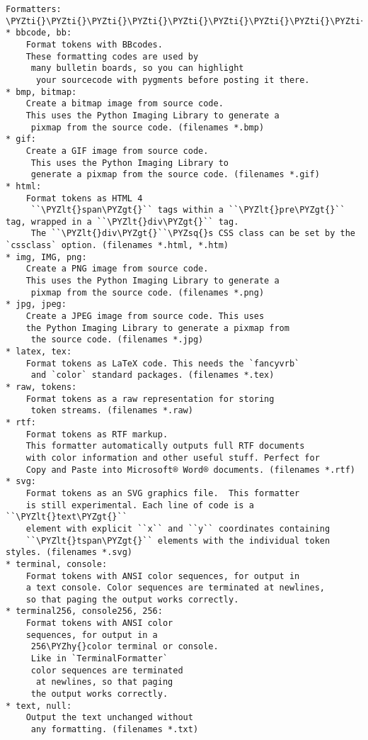 \begin{Verbatim}[commandchars=\\\{\}]
Formatters:
\PYZti{}\PYZti{}\PYZti{}\PYZti{}\PYZti{}\PYZti{}\PYZti{}\PYZti{}\PYZti{}\PYZti{}\PYZti{}
* bbcode, bb:
    Format tokens with BBcodes.
    These formatting codes are used by
     many bulletin boards, so you can highlight
      your sourcecode with pygments before posting it there.
* bmp, bitmap:
    Create a bitmap image from source code.
    This uses the Python Imaging Library to generate a
     pixmap from the source code. (filenames *.bmp)
* gif:
    Create a GIF image from source code.
     This uses the Python Imaging Library to
     generate a pixmap from the source code. (filenames *.gif)
* html:
    Format tokens as HTML 4
     ``\PYZlt{}span\PYZgt{}`` tags within a ``\PYZlt{}pre\PYZgt{}`` tag, wrapped in a ``\PYZlt{}div\PYZgt{}`` tag.
     The ``\PYZlt{}div\PYZgt{}``\PYZsq{}s CSS class can be set by the `cssclass` option. (filenames *.html, *.htm)
* img, IMG, png:
    Create a PNG image from source code.
    This uses the Python Imaging Library to generate a
     pixmap from the source code. (filenames *.png)
* jpg, jpeg:
    Create a JPEG image from source code. This uses
    the Python Imaging Library to generate a pixmap from
     the source code. (filenames *.jpg)
* latex, tex:
    Format tokens as LaTeX code. This needs the `fancyvrb`
     and `color` standard packages. (filenames *.tex)
* raw, tokens:
    Format tokens as a raw representation for storing
     token streams. (filenames *.raw)
* rtf:
    Format tokens as RTF markup.
    This formatter automatically outputs full RTF documents
    with color information and other useful stuff. Perfect for
    Copy and Paste into Microsoft® Word® documents. (filenames *.rtf)
* svg:
    Format tokens as an SVG graphics file.  This formatter
    is still experimental. Each line of code is a ``\PYZlt{}text\PYZgt{}``
    element with explicit ``x`` and ``y`` coordinates containing
    ``\PYZlt{}tspan\PYZgt{}`` elements with the individual token styles. (filenames *.svg)
* terminal, console:
    Format tokens with ANSI color sequences, for output in
    a text console. Color sequences are terminated at newlines,
    so that paging the output works correctly.
* terminal256, console256, 256:
    Format tokens with ANSI color
    sequences, for output in a
     256\PYZhy{}color terminal or console.
     Like in `TerminalFormatter`
     color sequences are terminated
      at newlines, so that paging
     the output works correctly.
* text, null:
    Output the text unchanged without
     any formatting. (filenames *.txt)
\end{Verbatim}
